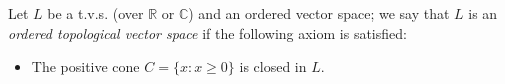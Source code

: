 Let $L$ be a t.v.s. (over $\mathbb{R}$ or $\mathbb{C}$) and an ordered vector space; we say that $L$ is an \emph{ordered topological vector space} if the following axiom is satisfied:

\begin{itemize}
  \item[(LTO)] The positive cone $C = \{x : x \geq 0\}$ is closed in $L$.
\end{itemize}
